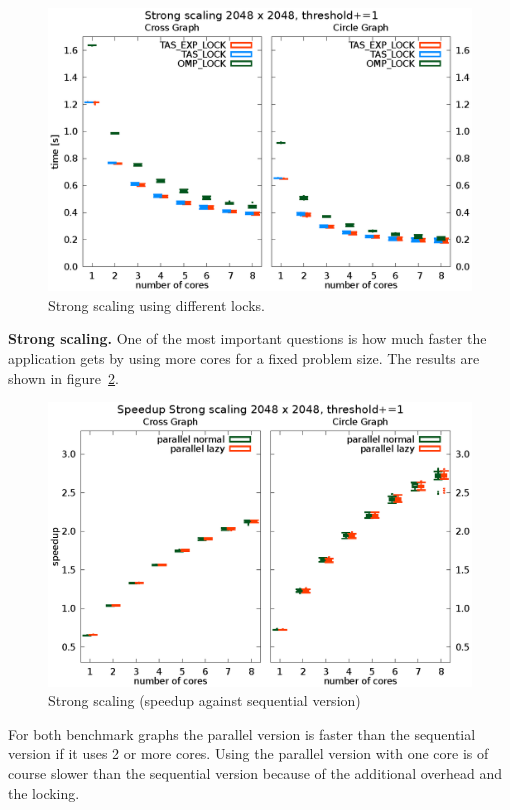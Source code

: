 \documentclass[letterpaper]{article}
\newcommand{\mypar}[1]{{\bf #1.}}
\begin{document}
\begin{figure}[h]\centering
  \includegraphics[scale=0.558]{lock_benchmark.eps}
  \caption{Strong scaling using different locks.\label{fig:lock_bench}}
\end{figure}


\mypar{Strong scaling}
One of the most important questions is how much faster the application gets by using more cores for a fixed problem size. The results are shown in figure~\ref{fig:strong_scaling}.
\begin{figure}[h]\centering
  \includegraphics[scale=0.558]{strong_scaling_speedup.eps}
  \caption{Strong scaling (speedup against sequential version) \label{fig:strong_scaling}}
\end{figure}
For both benchmark graphs the parallel version is faster than the sequential version if it uses 2 or more cores. Using the parallel version with one core is of course slower than the sequential version  because of the additional overhead and the locking.
\end{document}
